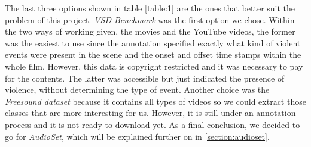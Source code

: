 	
	
	The last three options shown in table \ref{table:1} are the ones that better suit the problem of this project. \textit{VSD Benchmark} was the first option we chose. Within the two ways of working given, the movies and the YouTube videos, the former was the easiest to use since the annotation specified exactly what kind of violent events were present in the scene and the onset and offset time stamps within the whole film. However, this data is copyright restricted and it was necessary to pay for the contents. The latter was accessible but just indicated the presence of violence, without determining the type of event. Another choice was the \textit{Freesound dataset} because it contains all types of videos so we could extract those classes that are more interesting for us. However, it is still under an annotation process and it is not ready to download yet. As a final conclusion, we decided to go for \textit{AudioSet}, which will be explained further on in \ref{section:audioset}.
	
	
